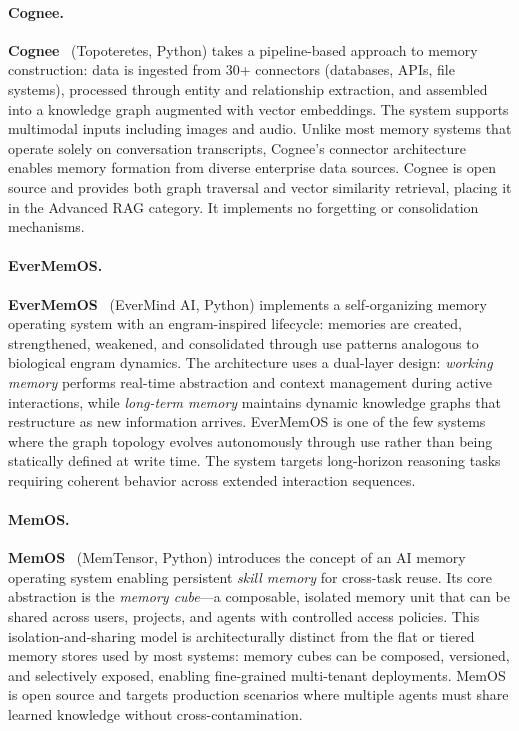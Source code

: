 \paragraph{Cognee.}
\textbf{Cognee}~\cite{cognee2026} (Topoteretes, Python) takes a
pipeline-based approach to memory construction: data is ingested from
30+ connectors (databases, APIs, file systems), processed through entity
and relationship extraction, and assembled into a knowledge graph
augmented with vector embeddings.  The system supports multimodal inputs
including images and audio.  Unlike most memory systems that operate
solely on conversation transcripts, Cognee's connector architecture
enables memory formation from diverse enterprise data sources.
Cognee is open source and provides both graph traversal and vector
similarity retrieval, placing it in the Advanced RAG category.  It
implements no forgetting or consolidation mechanisms.

\paragraph{EverMemOS.}
\textbf{EverMemOS}~\cite{evermemos2026} (EverMind AI, Python) implements
a self-organizing memory operating system with an engram-inspired
lifecycle: memories are created, strengthened, weakened, and
consolidated through use patterns analogous to biological engram
dynamics.  The architecture uses a dual-layer design:
\emph{working memory} performs real-time abstraction and context
management during active interactions, while \emph{long-term memory}
maintains dynamic knowledge graphs that restructure as new information
arrives.  EverMemOS is one of the few systems where the graph topology
evolves autonomously through use rather than being statically defined at
write time.  The system targets long-horizon reasoning tasks requiring
coherent behavior across extended interaction sequences.

\paragraph{MemOS.}
\textbf{MemOS}~\cite{memos2026} (MemTensor, Python) introduces the
concept of an AI memory operating system enabling persistent
\emph{skill memory} for cross-task reuse.  Its core abstraction is the
\emph{memory cube}---a composable, isolated memory unit that can be
shared across users, projects, and agents with controlled access
policies.  This isolation-and-sharing model is architecturally distinct
from the flat or tiered memory stores used by most systems: memory cubes
can be composed, versioned, and selectively exposed, enabling
fine-grained multi-tenant deployments.  MemOS is open source and targets
production scenarios where multiple agents must share learned knowledge
without cross-contamination.

